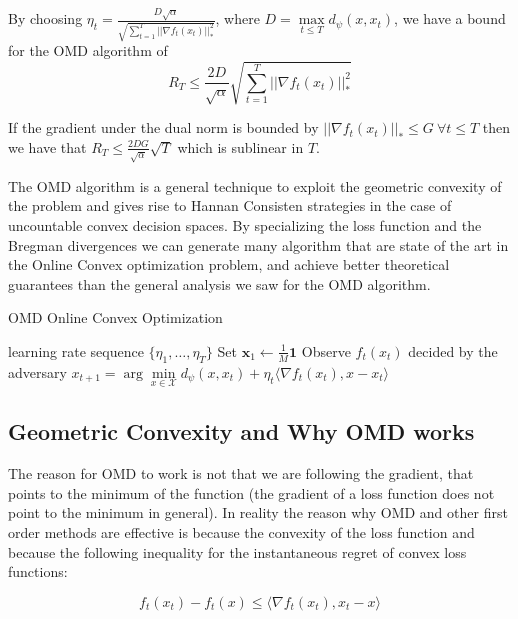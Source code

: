 By choosing $\eta_t=\frac{D\sqrt{\alpha}}{\sqrt{\sum\limits_{t=1}^T||\nabla f_t(x_t)||_*^2}}$, where $D=\max\limits_{t\le T}d_\psi(x,x_t)$, we have a bound for the OMD algorithm of 
$$R_T\le\frac{2D}{\sqrt\alpha}\sqrt{\sum\limits_{t=1}^T||\nabla f_t(x_t)||_*^2}$$

If the gradient under the dual norm is bounded by $||\nabla f_t(x_t)||_*\le G\ \forall t\le T$ then we have that $R_T\le\frac{2DG}{\sqrt\alpha}\sqrt T$ which is sublinear in $T$.

The OMD algorithm is a general technique to exploit the geometric convexity of the problem and gives rise to Hannan Consisten strategies in the case of uncountable convex decision spaces. By specializing the loss function and the Bregman divergences we can generate many algorithm that are state of the art in the Online Convex optimization problem, and achieve better theoretical guarantees than the general analysis we saw for the OMD algorithm.

\begin{algorithm}[t!]
    \caption{OMD Online Convex Optimization} 
    \label{alg:OMD_in_OCO}
    \begin{algorithmic}[1]
    \REQUIRE learning rate sequence $\{\eta_1, \ldots, \eta_T\}$  \nonumber
    \STATE Set $\mathbf{x}_1 \gets \frac{1}{M} \mathbf{1}$ \label{line:init}
    \STATE Observe $f_t(x_t)$ decided by the adversary \label{line:out}
    \STATE $x_{t+1} =\arg\min\limits_{x\in\mathcal X} d_\psi(x,x_t)+\eta_t\langle\nabla f_t(x_t),x-x_t\rangle$\label{line:update}
    \ENDFOR
    \end{algorithmic}
\end{algorithm}

\subsection{Geometric Convexity and Why OMD works} 

The reason for OMD to work is not that we are following the gradient, that points to the minimum of the function (the gradient of a loss function does not point to the minimum in general). In reality the reason why OMD and other first order methods are effective is because the convexity of the loss function and because the following inequality for the instantaneous regret of convex loss functions:

\begin{equation}\label{eq:ineq_convex}
f_t(x_t)-f_t(x)\le\langle\nabla f_t(x_t),x_t-x\rangle
\end{equation}

